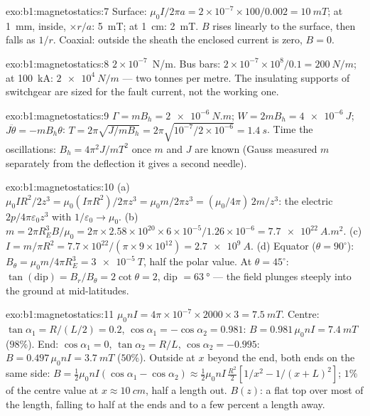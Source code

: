 \begin{solution}{exo:b1:magnetostatics:7}
Surface: $\mu_0I/2\pi a = 2 \times 10^{-7} \times 100/0.002 = \qty{10}{mT}$; at
\qty{1}{mm}, inside, $\times r/a$: \qty{5}{mT}; at \qty{1}{cm}: \qty{2}{mT}. $B$ rises
linearly to the surface, then falls as $1/r$. Coaxial: outside the sheath
the enclosed current is zero, $B = 0$.
\end{solution}

\begin{solution}{exo:b1:magnetostatics:8}
$2 \times 10^{-7}$~N/m. Bus bars: $2 \times 10^{-7} \times 10^8/0.1 = \qty{200}{N/m}$;
at \qty{100}{kA}: $\qty{2e4}{N/m}$ --- two tonnes per metre. The insulating
supports of switchgear are sized for the fault current, not the
working one.
\end{solution}

\begin{solution}{exo:b1:magnetostatics:9}
$\Gamma = mB_h = \qty{2e-6}{N.m}$; $W = 2mB_h = \qty{4e-6}{J}$; $J\ddot\theta =
-mB_h\theta$: $T = 2\pi\sqrt{J/mB_h} = 2\pi\sqrt{10^{-7}/2 \times 10^{-6}} =
\qty{1.4}{s}$. Time the oscillations: $B_h = 4\pi^2J/mT^2$ once $m$ and $J$
are known (Gauss measured $m$ separately from the deflection it gives
a second needle).
\end{solution}

\begin{solution}{exo:b1:magnetostatics:10}
(a) $\mu_0IR^2/2z^3 = \mu_0(I\pi R^2)/2\pi z^3 = \mu_0m/2\pi z^3 = (\mu_0/4\pi)\,2m/z^3$:
the electric $2p/4\pi\varepsilon_0z^3$ with $1/\varepsilon_0 \to \mu_0$. (b) $m = 2\pi R_E^3B/
\mu_0 = 2\pi \times 2.58 \times 10^{20} \times 6 \times 10^{-5}/1.26 \times 10^{-6} = \qty{7.7e22}{A.m^2}$.
(c) $I = m/\pi R^2 = 7.7 \times 10^{22}/(\pi \times 9 \times 10^{12}) = \qty{2.7e9}{A}$. (d)
Equator ($\theta = 90^\circ$): $B_\theta = \mu_0m/4\pi R_E^3 = \qty{3e-5}{T}$, half the
polar value. At $\theta = 45^\circ$: $\tan(\text{dip}) = B_r/B_\theta = 2\cot\theta = 2$,
dip $= \qty{63}{\degree}$ --- the field plunges steeply into the ground at
mid-latitudes.
\end{solution}

\begin{solution}{exo:b1:magnetostatics:11}
$\mu_0nI = 4\pi \times 10^{-7} \times 2000 \times 3 = \qty{7.5}{mT}$. Centre: $\tan\alpha_1 =
R/(L/2) = 0.2$, $\cos\alpha_1 = -\cos\alpha_2 = 0.981$: $B = 0.981\,\mu_0nI =
\qty{7.4}{mT}$ ($98\%$). End: $\cos\alpha_1 = 0$, $\tan\alpha_2 = R/L$, $\cos\alpha_2 =
-0.995$: $B = 0.497\,\mu_0nI = \qty{3.7}{mT}$ ($50\%$). Outside at $x$ beyond the
end, both ends on the same side: $B = \tfrac12\mu_0nI(\cos\alpha_1 - \cos\alpha_2)
\approx \tfrac12\mu_0nI\,\tfrac{R^2}{2}[1/x^2 - 1/(x + L)^2]$; $1\%$ of the centre
value at $x \approx \qty{10}{cm}$, half a length out. $B(z)$: a flat top over
most of the length, falling to half at the ends and to a few percent a
length away.
\end{solution}

